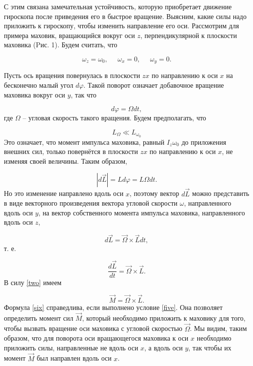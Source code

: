 \documentclass[a4paper, 12pt]{article}%
\begin{document}
	
	С этим связана замечательная устойчивость, которую приобретает движение гироскопа после приведения его в быстрое вращение. 
	Выясним, какие силы надо приложить к гироскопу, чтобы изменить 
	направление его оси. Рассмотрим для 
	примера маховик, вращающийся вокруг оси $ z $, перпендикулярной к плоскости маховика (Pис. 1). Будем считать, что
	
	\begin{equation}
		\omega_z = \omega_0, \;\;\;\;\; \omega_x = 0, \;\;\;\;\; \omega_y = 0.
	\end{equation}
	
	\noindent Пусть ось вращения повернулась в плоскости $ zx $ по направлению к оси $ x $ на бесконечно малый угол $ d\varphi $. Такой поворот означает добавочное вращение маховика вокруг оси $ y $, так что
	
	\begin{equation}
		d\varphi=\Omega dt,
	\end{equation}
	где $ \Omega $ -- угловая скорость такого вращения. Будем предполагать, что
	
	\begin{equation}
		L_\Omega \ll L_{\omega_0}
		\label{five}
	\end{equation}
	Это означает, что момент импульса маховика, равный $ I_z\omega_0 $ до приложения внешних сил, только повернётся в плоскости $ zx $ по направлению к оси $ x $, не изменяя своей величины. Таким образом, 
	
	\begin{equation}
		\left|d\vec{L}\right| = Ld\varphi = L\Omega dt.
	\end{equation}
	Но это изменение направлено вдоль оси $ x $, поэтому вектор $ d\vec{L} $ можно представить в виде векторного произведения вектора угловой скорости $ \omega $, направленного вдоль оси $ y $, на вектор собственного момента импульса маховика, направленного вдоль оси $ z $,
	
	\begin{equation}
		d\vec{L}=\vec{\Omega} \times \vec{L} dt,
	\end{equation}
	т. е.
	
	\begin{equation}
		\frac{d\vec{L}}{dt} = \vec{\Omega} \times \vec{L}.
	\end{equation}
	В силу \eqref{two} имеем
	
	\begin{equation}
		\vec{M} = \vec{\Omega} \times \vec{L}.
		\label{six}
	\end{equation}
	Формула \eqref{six} справедлива, если выполнено условие \eqref{five}. Она позволяет определить момент сил $ \vec{M} $, который необходимо приложить к маховику для того, чтобы вызвать вращение оси маховика с угловой скоростью $ \vec{\Omega} $. Мы видим, таким образом, что для поворота оси вращающегося маховика к оси $ x $ необходимо приложить силы, направленные не вдоль оси $ x $, а вдоль оси $ y $, так чтобы их момент $ \vec{M} $ был направлен вдоль оси $ x $.
	
\end{document}
